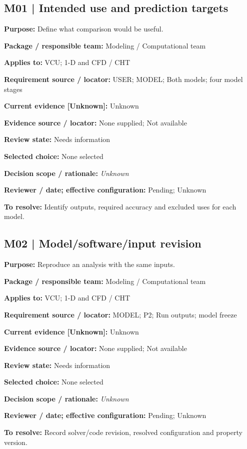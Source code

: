 \documentclass[11pt]{article}
\begin{document}
\par\noindent\begin{minipage}{\textwidth}\small\setlength{\parskip}{2pt}
\subsection*{M01 | Intended use and prediction targets}
\textbf{Purpose:} Define what comparison would be useful.\par
\textbf{Package / responsible team:} Modeling / Computational team\par
\textbf{Applies to:} VCU; 1-D and CFD / CHT\par
\textbf{Requirement source / locator:} USER; MODEL; Both models; four model stages\par
\textbf{Current evidence [Unknown]:} Unknown\par
\textbf{Evidence source / locator:} None supplied; Not available\par
\textbf{Review state:} Needs information\par
\textbf{Selected choice:} None selected\par
\textbf{Decision scope / rationale:} \textit{Unknown}\par
\textbf{Reviewer / date; effective configuration:} Pending; Unknown\par
\textbf{To resolve:} Identify outputs, required accuracy and excluded uses for each model.\par
\end{minipage}\par\vspace{5pt}
\par\noindent\begin{minipage}{\textwidth}\small\setlength{\parskip}{2pt}
\subsection*{M02 | Model/software/input revision}
\textbf{Purpose:} Reproduce an analysis with the same inputs.\par
\textbf{Package / responsible team:} Modeling / Computational team\par
\textbf{Applies to:} VCU; 1-D and CFD / CHT\par
\textbf{Requirement source / locator:} MODEL; P2; Run outputs; model freeze\par
\textbf{Current evidence [Unknown]:} Unknown\par
\textbf{Evidence source / locator:} None supplied; Not available\par
\textbf{Review state:} Needs information\par
\textbf{Selected choice:} None selected\par
\textbf{Decision scope / rationale:} \textit{Unknown}\par
\textbf{Reviewer / date; effective configuration:} Pending; Unknown\par
\textbf{To resolve:} Record solver/code revision, resolved configuration and property version.\par
\end{minipage}\par\vspace{5pt}
\end{document}

